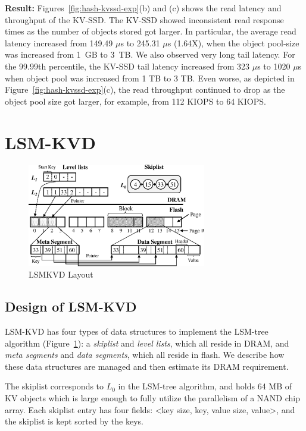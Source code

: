 \documentclass{abstract_hutech}
\newcommand{\ours}{LSM-KVD}
\begin{document}
\textbf{Result:}
Figures~\ref{fig:hash-kvssd-exp}(b) and (c) shows the read latency and
throughput of the KV-SSD.  The KV-SSD showed inconsistent read response times
as the number of objects stored got larger.  In particular, the average read
latency increased  from 149.49 $\mu$s to 245.31 $\mu$s (1.64X), when the object
pool-size was increased from 1~GB to 3~TB.  We also observed very long tail
latency.  For the 99.99th percentile, the KV-SSD tail latency increased from
323 $\mu$s to 1020 $\mu$s when object pool was increased from 1 TB to 3 TB.
Even worse, as depicted in Figure~\ref{fig:hash-kvssd-exp}(c), the read
throughput continued to drop as the object pool size got larger, for example,
from 112 KIOPS to 64 KIOPS.

\section{\ours{}}
\begin{figure}[h]
	\centering
	\includegraphics[height=4.5cm]{fig/fig3.eps}
	\caption{LSMKVD Layout}
	\label{fig:overall}\vspace{-11pt}
\end{figure}

\subsection{Design of \ours{}}
\ours{} has four types of data structures to implement the LSM-tree algorithm
(Figure~\ref{fig:overall}): a \textit{skiplist} and \textit{level lists}, which
all reside in DRAM, and  \textit{meta segments} and \textit{data segments},
which all reside in flash.  We describe how these data structures are
managed and then estimate its DRAM requirement. 

The skiplist corresponds to $L_0$ in the LSM-tree algorithm, and holds 64 MB of KV
objects which is large enough to fully utilize the parallelism of a NAND chip
array.  Each skiplist entry has four fields: <key size, key, value size,
value>, and the skiplist is kept sorted by the keys. 
\end{document}
